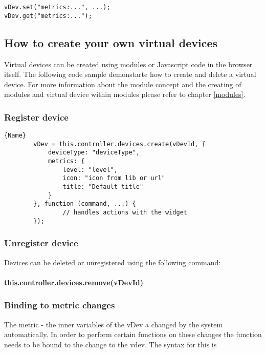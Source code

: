 \begin{lstlisting}
vDev.set("metrics:...", ...);  
vDev.get("metrics:...");
\end{lstlisting}


\subsection{How to create your own virtual devices}

Virtual devices can be created using modules or Javascript code in the browser itself. 
The following code sample demonstarte how to create and delete a virtual device. For more 
information about the module concept and the creating of modules and virtual device within 
modules please refer to chapter \ref{modules}.

\subsubsection{Register device}

\begin{lstlisting}[caption=Register Device]{Name} 
        vDev = this.controller.devices.create(vDevId, {
            deviceType: "deviceType",
            metrics: {
                level: "level",
                icon: "icon from lib or url"
                title: "Default title"
            }
        }, function (command, ...) {
                // handles actions with the widget
        });  
\end{lstlisting}

\subsubsection{Unregister device}

Devices can be deleted or unregistered  using the following command:

\paragraph{this.controller.devices.remove(vDevId)}

\subsubsection{Binding to metric changes}

The metric - the inner variables of the vDev a changed by the system automatically.
In order to perform certain functions on these changes the function needs to be 
bound to the change to the vdev. The syntax for this is

